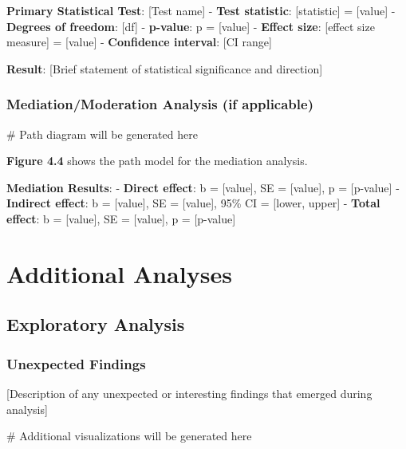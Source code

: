\documentclass[
  12pt,
  letterpaper,
  12pt,
  letterpaper,
  oneside]{report}
\newenvironment{Shaded}{\begin{snugshade}}{\end{snugshade}}
\newcommand{\CommentTok}[1]{\textcolor[rgb]{0.37,0.37,0.37}{#1}}
\begin{document}
\textbf{Primary Statistical Test}: {[}Test name{]} - \textbf{Test
statistic}: {[}statistic{]} = {[}value{]} - \textbf{Degrees of freedom}:
{[}df{]} - \textbf{p-value}: p = {[}value{]} - \textbf{Effect size}:
{[}effect size measure{]} = {[}value{]} - \textbf{Confidence interval}:
{[}CI range{]}

\textbf{Result}: {[}Brief statement of statistical significance and
direction{]}

\subsubsection{Mediation/Moderation Analysis (if
applicable)}\label{mediationmoderation-analysis-if-applicable}

\begin{Shaded}
\begin{Highlighting}[]
\CommentTok{\# Path diagram will be generated here}
\end{Highlighting}
\end{Shaded}

\textbf{Figure 4.4} shows the path model for the mediation analysis.

\textbf{Mediation Results}: - \textbf{Direct effect}: b = {[}value{]},
SE = {[}value{]}, p = {[}p-value{]} - \textbf{Indirect effect}: b =
{[}value{]}, SE = {[}value{]}, 95\% CI = {[}lower, upper{]} -
\textbf{Total effect}: b = {[}value{]}, SE = {[}value{]}, p =
{[}p-value{]}

\section{Additional Analyses}\label{additional-analyses}

\subsection{Exploratory Analysis}\label{exploratory-analysis}

\subsubsection{Unexpected Findings}\label{unexpected-findings}

{[}Description of any unexpected or interesting findings that emerged
during analysis{]}

\begin{Shaded}
\begin{Highlighting}[]
\CommentTok{\# Additional visualizations will be generated here}
\end{Highlighting}
\end{Shaded}
\end{document}
